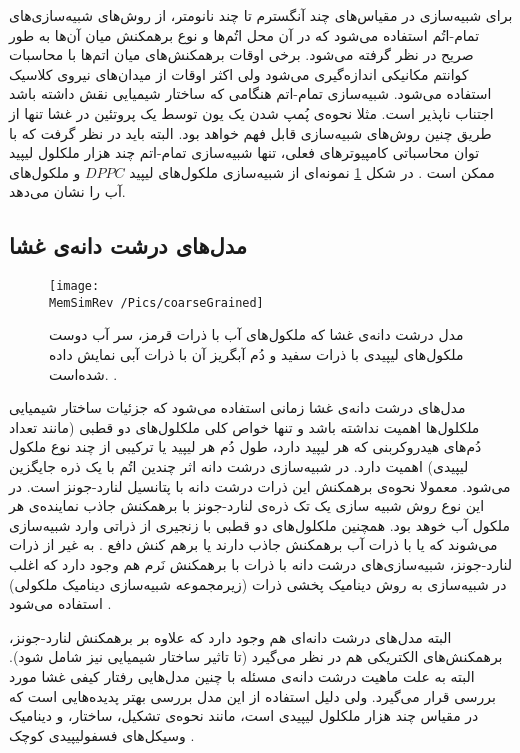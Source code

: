 برای شبیه‌سازی در مقیاس‌های چند آنگسترم تا چند نانومتر، از روش‌های شبیه‌سازی‌های تمام-اتُم
استفاده می‌شود که در آن محل اتُم‌ها و نوع برهمکنش‌ میان آن‌ها به طور صریح در نظر گرفته می‌شود. برخی اوقات برهمکنش‌های میان اتم‌ها با محاسبات کوانتم مکانیکی اندازه‌گیری می‌شود ولی اکثر اوقات از میدان‌های نیروی کلاسیک استفاده می‌شود. شبیه‌سازی تمام-اتم هنگامی که ساختار شیمیایی نقش داشته باشد اجتناب ناپذیر است. مثلا نحوه‌ی پُمپ شدن یک یون توسط یک پروتئین در غشا تنها از طریق چنین روش‌های شبیه‌سازی قابل فهم خواهد بود. البته باید در نظر گرفت که با توان محاسباتی کامپیوتر‌های فعلی، تنها شبیه‌سازی تمام-اتم چند هزار ملکلول لیپید ممکن است . در شکل 
\ref{fig:allAtom}
نمونه‌ای از شبیه‌سازی ملکول‌های لیپید
$DPPC$
و ملکول‌های آب را نشان می‌دهد. 



 \subsection{
 مدل‌های درشت دانه‌ی غشا
 }
 \begin{figure}[h]
\begin{center}
\texttt{[image: \\MemSimRev /Pics/coarseGrained]}
\caption{
مدل درشت دانه‌ی غشا که ملکول‌های آب با ذرات قرمز، سر آب دوست ملکول‌های لیپیدی با ذرات سفید و دُم آبگریز آن با ذرات آبی نمایش داده شده‌است.
\cite{AlGhoul2004}.
}
\label{fig:allAtom}
\end{center}
\end{figure}
 مدل‌های درشت دانه‌ی غشا
زمانی استفاده می‌شود که جزئیات ساختار شیمیایی ملکلول‌ها اهمیت نداشته باشد و تنها خواص کلی ملکلول‌های دو قطبی (مانند تعداد دُم‌های هیدروکربنی که هر لیپید دارد، طول دُم هر لیپید یا ترکیبی از چند نوع ملکول لیپیدی) اهمیت دارد. در شبیه‌سازی درشت‌ دانه اثر چندین اتُم با یک ذره‌ جایگزین می‌شود. معمولا نحوه‌ی برهمکنش این ذرات درشت دانه با پتانسیل لنارد-جونز
است. در این نوع روش شبیه‌ سازی یک تک ذره‌ی لنارد-جونز با برهمکنش جاذب نماینده‌ی هر ملکول آب خوهد بود. همچنین ملکلو‌ل‌های دو قطبی با زنجیری از ذراتی وارد شبیه‌سازی می‌شوند که یا با ذرات آب برهمکنش جاذب دارند یا برهم کنش دافع
\cite{Goetz1998, Goetz1999, Otter2003}.
به غیر از ذرات لنارد-جونز، شبیه‌سازی‌های درشت دانه با ذرات با برهمکنش نَرم هم وجود دارد که اغلب در شبیه‌سازی به روش دینامیک پخشی ذرات 
(زیرمجموعه شبیه‌سازی دینامیک ملکولی) استفاده می‌شود
\cite{Shillcock2002, Laradji2004PRL, Ortiz2005}.


البته مدل‌های درشت‌ دانه‌ای هم وجود دارد که علاوه بر برهمکنش لنارد-جونز، برهمکنش‌های الکتریکی هم در نظر می‌گیرد
\cite{Marrink2003, Marrink2007}
 (تا تاثیر ساختار شیمیایی نیز شامل شود). البته به علت ماهیت درشت دانه‌ی مسئله با چنین مدل‌هایی رفتار کیفی غشا مورد بررسی قرار می‌گیرد. ولی دلیل استفاده از این مدل بررسی بهتر پدیده‌هایی است که در مقیاس چند هزار ملکلول لیپیدی است، مانند نحوه‌ی تشکیل، ساختار، و دینامیک وسیکل‌های فسفولیپیدی کوچک
 \cite{Marrink2003,Marrink2009}.
